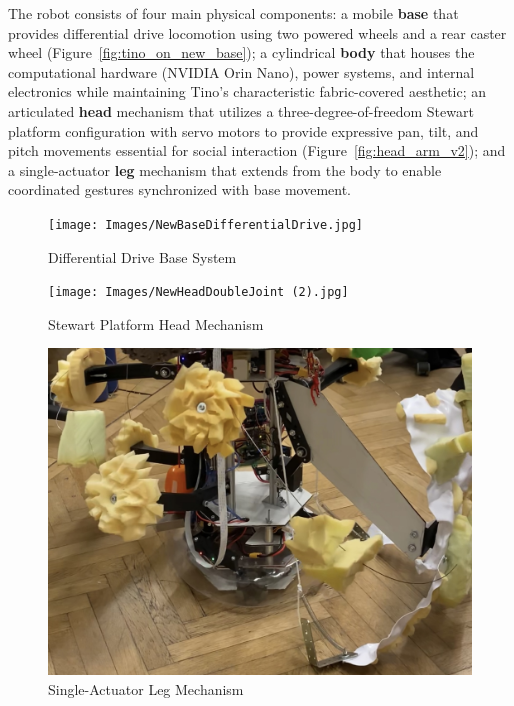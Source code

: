 The robot consists of four main physical components: a mobile \textbf{base} that provides differential drive locomotion using two powered wheels and a rear caster wheel (Figure~\ref{fig:tino_on_new_base}); a cylindrical \textbf{body} that houses the computational hardware (NVIDIA Orin Nano), power systems, and internal electronics while maintaining Tino's characteristic fabric-covered aesthetic; an articulated \textbf{head} mechanism that utilizes a three-degree-of-freedom Stewart platform configuration with servo motors to provide expressive pan, tilt, and pitch movements essential for social interaction (Figure~\ref{fig:head_arm_v2}); and a single-actuator \textbf{leg} mechanism that extends from the body to enable coordinated gestures synchronized with base movement.

\begin{figure}[H]
    \centering
    \begin{minipage}{0.3\textwidth}
        \centering
        \texttt{[image: Images/NewBaseDifferentialDrive.jpg]}
        \caption{Differential Drive Base System}
        \label{fig:base_component}
    \end{minipage}
    \quad
    \begin{minipage}{0.3\textwidth}
        \centering
        \texttt{[image: Images/NewHeadDoubleJoint (2).jpg]}
        \caption{Stewart Platform Head Mechanism}
        \label{fig:head_component}
    \end{minipage}
    \quad
    \begin{minipage}{0.3\textwidth}
        \centering
        \includegraphics[width=\textwidth]{Images/leg_detail.jpg}
        \caption{Single-Actuator Leg Mechanism}
        \label{fig:leg_component}
    \end{minipage}
\end{figure}

